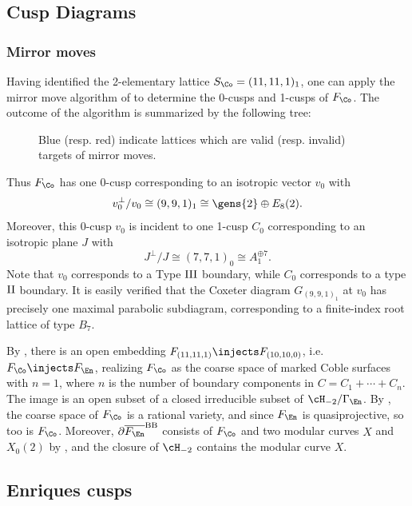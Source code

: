 \documentclass[../../main.tex]{subfiles}
\begin{document}
\subsection{Cusp Diagrams}

\subsubsection{Mirror moves}\label{sec:mirror-moves}
Having identified the 2-elementary lattice $S_\Co = (11, 11, 1)_1$, one can apply the mirror move algorithm of \cite[Thm. 5.10]{AE22} to determine the 0-cusps and 1-cusps of $F_\Co$.
The outcome of the algorithm is summarized by the following tree:

\begin{figure}[H]
    \centering
    
    \caption{Blue (resp. red) indicate lattices which are valid (resp. invalid) targets of mirror moves.}
    \label{fig:enter-label}
\end{figure}

Thus $F_\Co$ has one 0-cusp corresponding to an isotropic vector $v_0$ with \[
v_0^\perp/v_0 \cong (9,9,1)_1 \cong \gens{2} \oplus E_{8}(2)
.\] 
Moreover, this 0-cusp $v_0$ is incident to one 1-cusp $C_0$ corresponding to an isotropic plane $J$ with 
\[
J^\perp/J \cong (7,7,1)_0 \cong A_1^{\oplus 7}
.\]
Note that $v_0$ corresponds to a Type $\rm{III}$ boundary, while $C_0$ corresponds to a type $\rm{II}$ boundary. It is easily verified that the Coxeter diagram $G_{(9,9,1)_1}$ at $v_0$ has precisely one maximal parabolic subdiagram, corresponding to a finite-index root lattice of type $B_7$. 


By \cite[Prop. 5.46]{CD12}, there is an open embedding $F_{(11, 11, 1)} \injects F_{(10,10,0)}$, i.e. $F_\Co \injects F_\En$, realizing $F_\Co$ as the coarse space of marked Coble surfaces with $n=1$, where $n$ is the number of boundary components in $C = C_1 + \cdots + C_n$. The image is an open subset of a closed irreducible subset of $\cH_{-2}/\Gamma_\En$. By \cite[Thm. 5.8.2]{CD12}, the coarse space of $F_\Co$ is a rational variety, and since $F_\En$ is quasiprojective, so too is $F_\Co$. Moreover, $\partial \overline{F_{\En}}^{\mathrm{BB}}$ consists of $F_{\Co}$ and two modular curves $X$ and $X_0(2)$ by \cite[Rem.5.9.12]{CD12}, and the closure of $\cH_{-2}$ contains the modular curve $X$.

\subsection{Enriques cusps}
\end{document}
